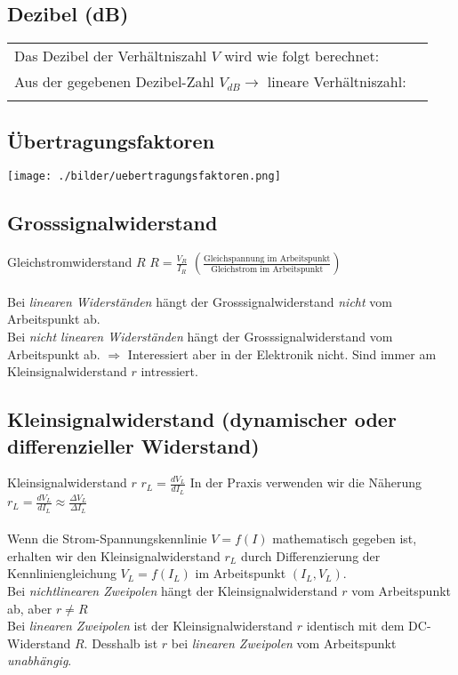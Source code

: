 	
		\subsection{Dezibel (dB)}
			\begin{tabular}{p{10cm}p{8cm}}
        		Das Dezibel der Verhältniszahl $V$ wird wie folgt berechnet:
        		& \fbox{$V_{dB}=20 log \left| V\right|$}\\
        		Aus der gegebenen Dezibel-Zahl $V_{dB}\to$ lineare Verhältniszahl:
        		& \fbox{$V=10^{\frac{V_{dB}}{20dB}}$}\\ \\
        \end{tabular}

		\subsection{Übertragungsfaktoren}
			\begin{minipage}{18cm}
	   	    	\texttt{[image: ./bilder/uebertragungsfaktoren.png]}
       		\end{minipage}

		\subsection{Grosssignalwiderstand}
			Gleichstromwiderstand $R$ \hspace{15mm} $R=\frac{V_R}{I_R}$
			$\left(\frac{\mbox{Gleichspannung im Arbeitspunkt}}{\mbox{Gleichstrom im
			Arbeitspunkt}}\right)$\\ \\
			Bei {\it linearen Widerständen} hängt der Grosssignalwiderstand
			{\it nicht} vom Arbeitspunkt ab.\\
			Bei {\it nicht linearen Widerständen} hängt der Grosssignalwiderstand
			vom Arbeitspunkt ab. $\Rightarrow$ Interessiert aber in der Elektronik nicht.
			Sind immer am Kleinsignalwiderstand $r$ intressiert.\\

		\subsection{Kleinsignalwiderstand (dynamischer oder differenzieller
		Widerstand)}
			Kleinsignalwiderstand $r$ \hspace{15mm} $r_L=\frac{dV_L}{dI_L}$ In der Praxis
			verwenden wir die Näherung $r_L=\frac{dV_L}{dI_L}\approx \frac{\Delta
			V_L}{\Delta I_L}$\\ \\
			Wenn die Strom-Spannungskennlinie $V=f(I)$ mathematisch gegeben ist, erhalten
			wir den Kleinsignalwiderstand $r_L$ durch Differenzierung der
			Kennliniengleichung $V_L=f(I_L)$ im Arbeitspunkt $(I_L, V_L)$.\\
			Bei {\it nichtlinearen Zweipolen} hängt der Kleinsignalwiderstand $r$
			vom Arbeitspunkt ab, aber $r\neq R$\\
			Bei {\it linearen Zweipolen} ist der Kleinsignalwiderstand $r$
			identisch mit dem DC-Widerstand $R$. Desshalb ist $r$ bei {\it linearen
			Zweipolen} vom Arbeitspunkt {\it unabhängig}.\\
		
